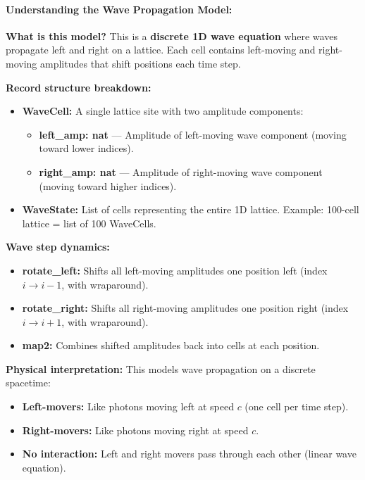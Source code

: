 \paragraph{Understanding the Wave Propagation Model:}

\textbf{What is this model?} This is a \textbf{discrete 1D wave equation} where waves propagate left and right on a lattice. Each cell contains left-moving and right-moving amplitudes that shift positions each time step.

\textbf{Record structure breakdown:}
\begin{itemize}
    \item \textbf{WaveCell:} A single lattice site with two amplitude components:
    \begin{itemize}
        \item \textbf{left\_amp: nat} — Amplitude of left-moving wave component (moving toward lower indices).
        \item \textbf{right\_amp: nat} — Amplitude of right-moving wave component (moving toward higher indices).
    \end{itemize}
    
    \item \textbf{WaveState:} List of cells representing the entire 1D lattice. Example: 100-cell lattice = list of 100 WaveCells.
\end{itemize}

\textbf{Wave step dynamics:}
\begin{itemize}
    \item \textbf{rotate\_left:} Shifts all left-moving amplitudes one position left (index $i \to i-1$, with wraparound).
    \item \textbf{rotate\_right:} Shifts all right-moving amplitudes one position right (index $i \to i+1$, with wraparound).
    \item \textbf{map2:} Combines shifted amplitudes back into cells at each position.
\end{itemize}

\textbf{Physical interpretation:} This models wave propagation on a discrete spacetime:
\begin{itemize}
    \item \textbf{Left-movers:} Like photons moving left at speed $c$ (one cell per time step).
    \item \textbf{Right-movers:} Like photons moving right at speed $c$.
    \item \textbf{No interaction:} Left and right movers pass through each other (linear wave equation).
\end{itemize}

